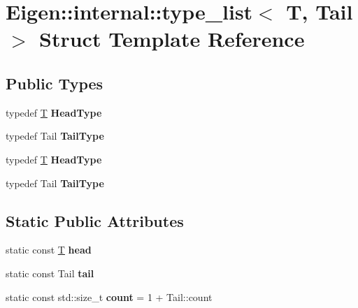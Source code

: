 \hypertarget{struct_eigen_1_1internal_1_1type__list}{}\section{Eigen\+:\+:internal\+:\+:type\+\_\+list$<$ T, Tail $>$ Struct Template Reference}
\label{struct_eigen_1_1internal_1_1type__list}
\subsection*{Public Types}
\begin{DoxyCompactItemize}
\item 
\mbox{\label{struct_eigen_1_1internal_1_1type__list_ad0809ddb4d50be4aca3c16ef9249b90e}} 
typedef \hyperlink{group___sparse_core___module}{T} {\bfseries Head\+Type}
\item 
\mbox{\label{struct_eigen_1_1internal_1_1type__list_ad501c6b2cd4bf51304728c71b423ce58}} 
typedef Tail {\bfseries Tail\+Type}
\item 
\mbox{\label{struct_eigen_1_1internal_1_1type__list_ad0809ddb4d50be4aca3c16ef9249b90e}} 
typedef \hyperlink{group___sparse_core___module}{T} {\bfseries Head\+Type}
\item 
\mbox{\label{struct_eigen_1_1internal_1_1type__list_ad501c6b2cd4bf51304728c71b423ce58}} 
typedef Tail {\bfseries Tail\+Type}
\end{DoxyCompactItemize}
\subsection*{Static Public Attributes}
\begin{DoxyCompactItemize}
\item 
\mbox{\label{struct_eigen_1_1internal_1_1type__list_aa9e186711d81b839d4c87fdf63ff024b}} 
static const \hyperlink{group___sparse_core___module}{T} {\bfseries head}
\item 
\mbox{\label{struct_eigen_1_1internal_1_1type__list_a7b708d51b0bab58909958eaa735b80ed}} 
static const Tail {\bfseries tail}
\item 
\mbox{\label{struct_eigen_1_1internal_1_1type__list_a517129cdee45af73e20d70ce0029b631}} 
static const std\+::size\+\_\+t {\bfseries count} = 1 + Tail\+::count
\end{DoxyCompactItemize}


